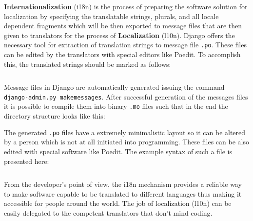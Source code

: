 \documentclass[12pt,oneside,a4paper]{article}
\begin{document}
\textbf{Internationalization} (i18n) is the process of preparing the software solution for localization by specifying the translatable strings, plurals, and all locale dependent fragments which will be then exported to message files that are then given to translators for the process of \textbf{Localization} (l10n). Django offers the necessary tool for extraction of translation strings to message file \texttt{.po}. These files can be edited by the translators with special editors like Poedit. To accomplish this, the translated strings should be marked as follows:
\inputminted[linenos]{python}{src/i18n-1.py}

Message files in Django are automatically generated issuing the command \texttt{django-admin.py makemessages}. After successful generation of the messages files it is possible to compile them into binary \texttt{.mo} files such that in the end the directory structure looks like this:

The generated \texttt{.po} files have a extremely minimalistic layout so it can be altered by a person which is not at all initiated into programming. These files can be also edited with special software like Poedit. The example syntax of such a file is presented here:
\inputminted[linenos]{python}{src/i18n-2.py}

From the developer's point of view, the i18n mechanism provides a reliable way to make software capable to be translated to different languages thus making it accessible for people around the world. The job of localization (l10n) can be easily delegated to the competent translators that don't mind coding.
\end{document}
